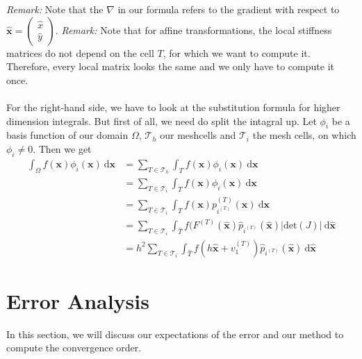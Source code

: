 \documentclass[a4paper,12pt]{article}
\begin{document}
\textit{Remark:} Note that the $\nabla$ in our formula refers to the gradient with respect to $\bm{\hat x}=\begin{pmatrix} \hat x \\ \hat y\end{pmatrix}$.
\textit{Remark:} Note that for affine transformations, the local stiffness matrices do not depend on the cell $T$, for which we want to compute it. Therefore, every local matrix looks the same and we only have to compute it once.
\\ \\
For the right-hand side, we have to look at the substitution formula for higher dimension integrals. But first of all, we need do split the intagral up. Let $\phi_i$ be a basis function of our domain $\Omega$, $\mathscr{T}_h$ our meshcells and $\mathscr{T}_i$ the mesh cells, on which $\phi_i \neq 0$. Then we get
\begin{align*}
\int_{\Omega}f(\bm{x})\phi_i(\bm{x})\ \mbox{d}\bm{x}&=\sum_{T\in\mathscr{T}_h} \int_Tf(\bm{x})\phi_i(\bm{x})\ \mbox{d}\bm{x} \\
													&=\sum_{T\in\mathscr{T}_i} \int_Tf(\bm{x})\phi_i(\bm{x})\ \mbox{d}\bm{x} \\
													&=\sum_{T\in\mathscr{T}_i} \int_Tf(\bm{x})p^{(T)}_{i^{(T)}}(\bm{x})\ \mbox{d}\bm{x} \\
													&=\sum_{T\in\mathscr{T}_i} \int_{\hat T}f(F^{(T)}(\bm{\hat x})\hat p_{i^{(T)}}(\bm{\hat x})|\mbox{det}(J)|\ \mbox{d}\bm{\hat x} \\
													&=h^2\sum_{T\in\mathscr{T}_i} \int_{\hat T}f(h\bm{\hat x}+v^{(T)}_1)\hat p_{i^{(T)}}(\bm{\hat x})\ \mbox{d}\bm{\hat x}						
\end{align*}

\section{Error Analysis}

In this section, we will discuss our expectations of the error and our method to compute the convergence order.
\end{document}
